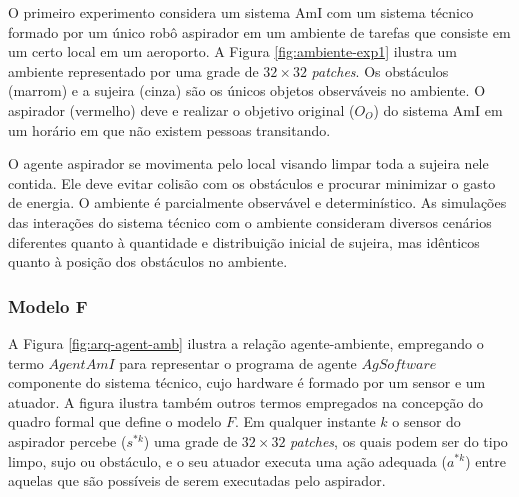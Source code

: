 O primeiro experimento considera um sistema AmI com um sistema técnico formado por um único robô aspirador em um ambiente de tarefas que consiste em um certo local em um aeroporto. A Figura \ref{fig:ambiente-exp1} ilustra um ambiente representado por uma grade de $32 \times 32$ \textit{patches}. Os obstáculos (marrom) e a sujeira (cinza) são os únicos objetos observáveis no ambiente. O aspirador (vermelho) deve e realizar o objetivo original ($O_O$) do sistema AmI em um horário em que não existem pessoas transitando. 

\begin{figure}[h!]
    \centering
\end{figure}

O agente aspirador se movimenta pelo local visando limpar toda a sujeira nele contida. Ele deve evitar colisão com os obstáculos e procurar minimizar o gasto de energia. O ambiente é parcialmente observável e determinístico. As simulações das interações do sistema técnico com o ambiente consideram diversos cenários diferentes quanto à quantidade e distribuição inicial de sujeira, mas idênticos quanto à posição dos obstáculos no ambiente. 

\subsubsection{Modelo F}

A Figura \ref{fig:arq-agent-amb} ilustra a relação agente-ambiente, empregando o termo $AgentAmI$ para representar o programa de agente $AgSoftware$ componente do sistema técnico, cujo hardware é formado por um sensor e um atuador. A figura ilustra também outros termos empregados na concepção do quadro formal que define o modelo $F$. Em qualquer instante $k$ o sensor do aspirador percebe ($s^{*k}$) uma grade de $32 \times 32$ \textit{patches}, os quais podem ser do tipo limpo, sujo ou obstáculo, e o seu atuador executa uma ação adequada ($a^{*k}$) entre aquelas que são possíveis de serem executadas pelo aspirador.

